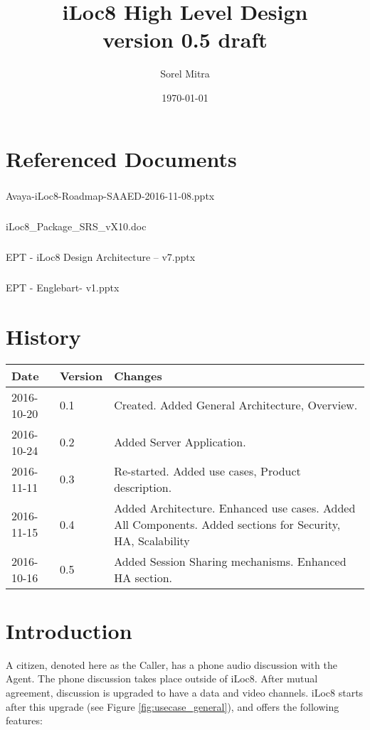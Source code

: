 \documentclass{article}
\title{iLoc8 High Level Design \\ \large version 0.5 draft}
\author{Sorel Mitra}
\date{\today}
\begin{document}
	\maketitle
	
	\section*{Referenced Documents}
	
	\subparagraph{} Avaya-iLoc8-Roadmap-SAAED-2016-11-08.pptx \label{doc:roadmap}
	\subparagraph{} iLoc8\_Package\_SRS\_vX10.doc \label{doc:srs}
	\subparagraph{} EPT - iLoc8 Design Architecture – v7.pptx \label{doc:design_original}
	\subparagraph{} EPT - Englebart- v1.pptx \label{doc:design_engelbart}
	
	\section*{History}
	\begin{longtable}[l]{ | l | l | p{} |}
		\hline
		\textbf{Date} & \textbf{Version} & \textbf{Changes} \\ \hline
		\endhead
		2016-10-20 & 0.1 & Created. Added General Architecture, Overview. \\ \hline
		2016-10-24 & 0.2 & Added Server Application. \\ \hline
		2016-11-11 & 0.3 & Re-started. Added use cases, Product description. \\ \hline
		2016-11-15 & 0.4 & Added Architecture. Enhanced use cases. Added All Components. Added sections for Security, HA, Scalability\\ \hline
		2016-10-16 & 0.5 & Added Session Sharing mechanisms. Enhanced HA section. \\ \hline
	\end{longtable}
	
	\newpage
	
	\tableofcontents
	
	\newpage
	
	\section{Introduction}

	A citizen, denoted here as the Caller, has a phone audio discussion with the Agent. The phone discussion takes place outside of iLoc8. After mutual agreement, discussion is upgraded to have a data and video channels. iLoc8 starts after this upgrade (see Figure \ref{fig:usecase_general}), and offers the following features:
	
\end{document}
